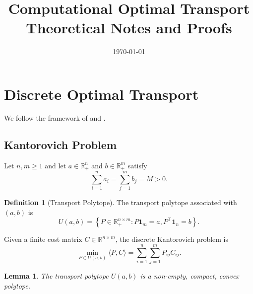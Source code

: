 \documentclass[11pt,a4paper]{article}
\title{Computational Optimal Transport\\
Theoretical Notes and Proofs}
\date{\today}
\author{}
\newtheorem{lemma}[theorem]{Lemma}
\theoremstyle{definition}
\newtheorem{definition}[theorem]{Definition}
\begin{document}
\maketitle

\section{Discrete Optimal Transport}

We follow the framework of
\cite{peyre2019computational}
and \cite{santambrogio2015optimal}.

\subsection{Kantorovich Problem}

Let $n,m\geq 1$ and let $a\in\mathbb{R}_+^n$ and $b\in\mathbb{R}_+^m$ satisfy
\[\sum_{i=1}^{n}a_i=\sum_{j=1}^{m}b_j=M>0.\]

\begin{definition}[Transport Polytope]
The transport polytope associated with $(a,b)$ is
\[ U(a,b) = \left\{P\in\mathbb{R}_+^{n\times m} : P\mathbf{1}_m = a, P^\top \mathbf{1}_n = b\right\}. \]
\end{definition}

Given a finite cost matrix $C\in\mathbb{R}^{n\times m}$, the discrete Kantorovich problem is
\begin{equation}
\label{eq:kantorovich}
\min_{P\in U(a,b)} \langle P, C\rangle = \sum_{i=1}^{n}\sum_{j=1}^{m}P_{ij}C_{ij}.
\end{equation}

\begin{lemma}
    \label{lem:transport-polytype}
    The transport polytope $U(a,b)$ is a non-empty, compact, convex polytope.
\end{lemma}
\end{document}
